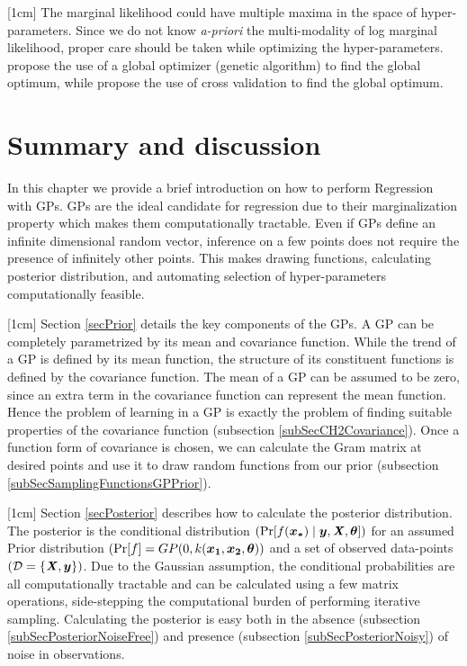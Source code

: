 [1cm]
The marginal likelihood could have multiple maxima in the space of hyper-parameters. Since we do not know \textit{a-priori} the multi-modality of log marginal likelihood, proper care should be taken while optimizing the hyper-parameters. \cite{forrester2008engineering} propose the use of a global optimizer (genetic algorithm) to find the global optimum, while \cite{le2013multi} propose the use of cross validation to find the global optimum.

\section{Summary and discussion}\label{secCH2Discussion}
In this chapter we provide a brief introduction on how to perform Regression with GPs. GPs are the ideal candidate for regression due to their marginalization property which makes them computationally tractable. Even if GPs define an infinite dimensional random vector, inference on a few points does not require the presence of infinitely other points. This makes drawing functions, calculating posterior distribution, and automating selection of hyper-parameters computationally feasible.  

[1cm]
Section \ref{secPrior} details the key components of the GPs. A GP can be completely parametrized by its mean and covariance function. While the trend of a GP is defined by its mean function, the structure of its constituent functions is defined by the covariance function. The mean of a GP can be assumed to be zero, since an extra term in the covariance function can represent the mean function. Hence the problem of learning in a GP is exactly the problem of finding suitable properties of the covariance function (subsection \ref{subSecCH2Covariance}). Once a function form of covariance is chosen, we can calculate the Gram matrix at desired points and use it to draw random functions from our prior (subsection \ref{subSecSamplingFunctionsGPPrior}). 

[1cm]
Section \ref{secPosterior} describes how to calculate the posterior distribution. The posterior is the conditional distribution $(\Pr[f(\boldsymbol{x_{*}}) \mid \boldsymbol{y}, \bm{\mathit{X}}, \boldsymbol{\theta}])$ for an assumed Prior distribution $(\Pr[f] = GP(0, k(\boldsymbol{x_1}, \boldsymbol{x_2}, \boldsymbol{\theta}))$ and a set of observed data-points $(\mathcal{D} = \{\bm{\mathit{X}}, \boldsymbol{y}\})$. Due to the Gaussian assumption, the conditional probabilities are all computationally tractable and can be calculated using a few matrix operations, side-stepping the computational burden of performing iterative sampling. Calculating the posterior is easy both in the absence (subsection \ref{subSecPosteriorNoiseFree}) and presence (subsection \ref{subSecPosteriorNoisy}) of noise in observations. 

